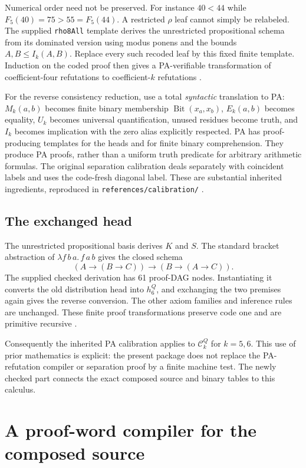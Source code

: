 \documentclass[11pt,letterpaper]{article}
\newcommand{\file}[1]{\begingroup\def\UrlBreaks{\do\/\do\_\do\-\do\.}\texttt{\nolinkurl{#1}}\endgroup}
\begin{document}
Numerical order need not be preserved. For instance $40<44$ while
$F_5(40)=75>55=F_5(44)$. A restricted $\rho$ leaf cannot simply be relabeled.
The supplied \texttt{rho8All} template derives the unrestricted propositional
schema from its dominated version using modus ponens and the bounds
$A,B\le I_k(A,B)$. Replace every such recoded leaf by this fixed finite template.
Induction on the coded proof then gives a PA-verifiable transformation of
coefficient-four refutations to coefficient-$k$ refutations \cite{radix}.

For the reverse consistency reduction, use a total \emph{syntactic} translation
to PA: $M_k(a,b)$ becomes finite binary membership
$\operatorname{Bit}(x_a,x_b)$, $E_k(a,b)$ becomes equality, $U_k$ becomes universal
quantification, unused residues become truth, and $I_k$ becomes implication
with the zero alias explicitly respected. PA has proof-producing templates
for the heads and for finite binary comprehension. They produce PA proofs,
rather than a uniform truth predicate for arbitrary arithmetic formulas.
The original separation calibration deals separately with coincident labels
and uses the code-fresh diagonal label. These are substantial inherited
ingredients, reproduced in \file{references/calibration/} \cite{primary,radix}.

\subsection{The exchanged head}

The unrestricted propositional basis derives $K$ and $S$. The standard bracket
abstraction of $\lambda f\,b\,a.\,f\,a\,b$ gives the closed schema
\[
 (A\to(B\to C))\to(B\to(A\to C)).
\]
The supplied checked derivation has 61 proof-DAG nodes. Instantiating it converts
the old distribution head into $h_6^Q$, and exchanging the two premises again
gives the reverse conversion. The other axiom families and inference rules
are unchanged. These finite proof transformations preserve code one and are
primitive recursive \cite{q}.

Consequently the inherited PA calibration applies to $\mathcal C_k^Q$ for
$k=5,6$. This use of prior mathematics is explicit: the present package does
not replace the PA-refutation compiler or separation proof by a finite machine
test. The newly checked part connects the exact composed source and binary
tables to this calculus.

\section{A proof-word compiler for the composed source}
\label{sec:compiler}
\end{document}
